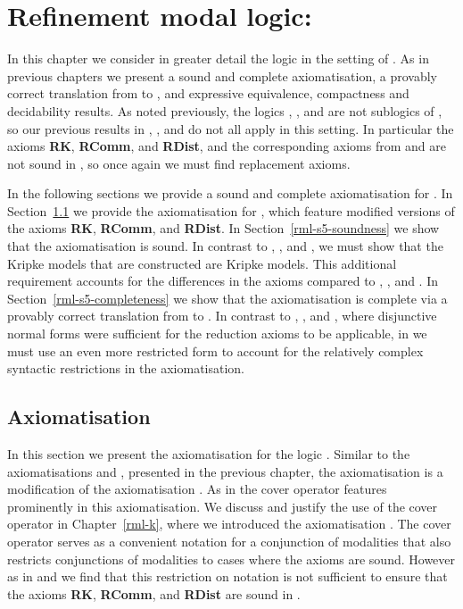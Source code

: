 \chapter{Refinement modal logic: \classS{}}\label{rml-s5}

In this chapter we consider in greater detail the logic \logicRmlS{} in the setting of \classS{}.
As in previous chapters we present a sound and complete axiomatisation, a provably correct translation from \langRml{} to \langMl{}, and expressive equivalence, compactness and decidability results.
As noted previously, the logics \logicRmlK{}, \logicRmlKFF{}, and \logicKD{} are not sublogics of \logicRmlS{}, so our previous results in \logicRmlK{}, \logicRmlKFF{}, and \logicKD{} do not all apply in this setting.
In particular the axioms {\bf RK}, {\bf RComm}, and {\bf RDist}, and the corresponding axioms from \logicRmlKFF{} and \logicRmlKD{} are not sound in \logicRmlS{}, so once again we must find replacement axioms.

In the following sections we provide a sound and complete axiomatisation for \logicRmlS{}.
In Section~\ref{rml-s5-axiomatisation} we provide the axiomatisation for \logicRmlS{}, which feature modified versions of the axioms {\bf RK}, {\bf RComm}, and {\bf RDist}.
In Section~\ref{rml-s5-soundness} we show that the axiomatisation is sound.
In contrast to \logicRmlK{}, \logicRmlKFF{}, and \logicRmlKD{}, we must show that the Kripke models that are constructed are \classS{} Kripke models.
This additional requirement accounts for the differences in the axioms compared to \logicRmlK{}, \logicRmlKFF{}, and \logicRmlKD{}.
In Section~\ref{rml-s5-completeness} we show that the axiomatisation is complete via a provably correct translation from \langRml{} to \langMl{}.
In contrast to \logicRmlK{}, \logicRmlKFF{}, and \logicRmlKD{}, where disjunctive normal forms were sufficient for the reduction axioms to be applicable, in \logicRmlS{} we must use an even more restricted form to account for the relatively complex syntactic restrictions in the axiomatisation.

\section{Axiomatisation}\label{rml-s5-axiomatisation}

In this section we present the axiomatisation \axiomRmlS{} for the logic \logicRmlS{}.
Similar to the axiomatisations \axiomRmlKFF{} and \axiomRmlKD{}, presented in the previous chapter, the axiomatisation \axiomRmlS{} is a modification of the axiomatisation \axiomRmlK{}.
As in \axiomRmlK{} the cover operator features prominently in this axiomatisation.
We discuss and justify the use of the cover operator in Chapter~\ref{rml-k}, where we introduced the axiomatisation \axiomRmlK{}.
The cover operator serves as a convenient notation for a conjunction of modalities that also restricts conjunctions of modalities to cases where the axioms are sound.
However as in \axiomRmlKFF{} and \axiomRmlKD{} we find that this restriction on notation is not sufficient to ensure that the axioms {\bf RK}, {\bf RComm}, and {\bf RDist} are sound in \logicRmlS{}.

